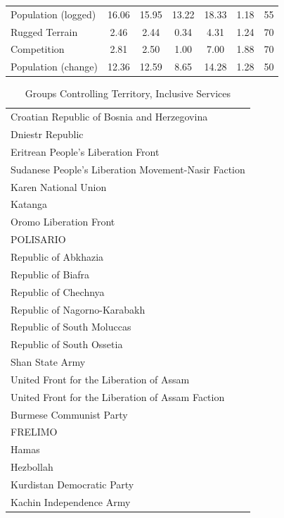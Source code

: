 \documentclass[12pt, letterpaper]{article}
\begin{document}
\begin{center}
\begin{table}[htbp]
\begin{tabular}{l*{1}{cccccc}}
Population (logged) &       16.06&       15.95&       13.22&       18.33&        1.18&          55\\
Rugged Terrain      &        2.46&        2.44&        0.34&        4.31&        1.24&          70\\
Competition         &        2.81&        2.50&        1.00&        7.00&        1.88&          70\\
Population (change) &       12.36&       12.59&        8.65&       14.28&        1.28&          50\\
\hline\hline
\end{tabular}
\end{table}

\newpage
\clearpage

\begin{table}[htbp]
\centering
\small
\setcounter{table}{1}
\renewcommand\thetable{A.\Roman{table}}
\caption{Groups Controlling Territory, Inclusive Services}
 \begin{tabular}{l} 
 \hline
 \hline
Croatian Republic of Bosnia and Herzegovina \\
Dniestr Republic \\
Eritrean People's Liberation Front \\
Sudanese People's Liberation Movement-Nasir Faction \\
Karen National Union \\
Katanga \\
Oromo Liberation Front \\
POLISARIO \\
Republic of Abkhazia \\
Republic of Biafra \\
Republic of Chechnya \\
Republic of Nagorno-Karabakh \\
Republic of South Moluccas \\
Republic of South Ossetia \\
Shan State Army \\
United Front for the Liberation of Assam \\
United Front for the Liberation of Assam Faction \\
Burmese Communist Party \\
FRELIMO \\
Hamas \\
Hezbollah \\
Kurdistan Democratic Party \\
Kachin Independence Army \\

\end{tabular}
\end{table}
\end{center}
\end{document}
